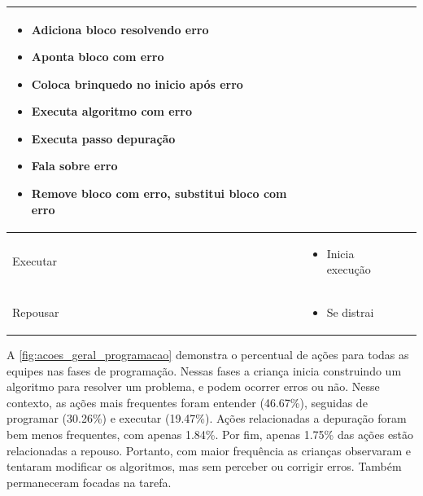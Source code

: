 \begin{quadro}[!h]
\begin{table_env}
\begin{tabular}{@{}l m{} c@{}}
        \begin{itemize}
            \item Adiciona bloco resolvendo erro
            \item Aponta bloco com erro
            \item Coloca brinquedo no inicio após erro
            \item Executa algoritmo com erro
            \item Executa passo depuração
            \item Fala sobre erro
            \item Remove bloco com erro, substitui bloco com erro
        \end{itemize} 
        \\ \hline
        
        Executar &

        \begin{itemize}
            \item Inicia execução
        \end{itemize} 
        
        \\ \hline
        Repousar & 
        \begin{itemize}
            \item Se distrai
        \end{itemize} 

        \\ \bottomrule
        \end{tabular}
    \end{table_env}
    \sourceauthor
 \end{quadro}

A \autoref{fig:acoes_geral_programacao} demonstra o percentual de ações para todas as equipes nas fases de programação. Nessas fases a criança inicia construindo um algoritmo para resolver um problema, e podem ocorrer erros ou não. Nesse contexto, as ações mais frequentes foram entender (46.67\%), seguidas de programar (30.26\%) e executar (19.47\%). Ações relacionadas a depuração foram bem menos frequentes, com apenas 1.84\%. Por fim, apenas 1.75\% das ações estão relacionadas a repouso. Portanto, com maior frequência as crianças observaram e tentaram modificar os algoritmos, mas sem perceber ou corrigir erros. Também permaneceram focadas na tarefa. 

